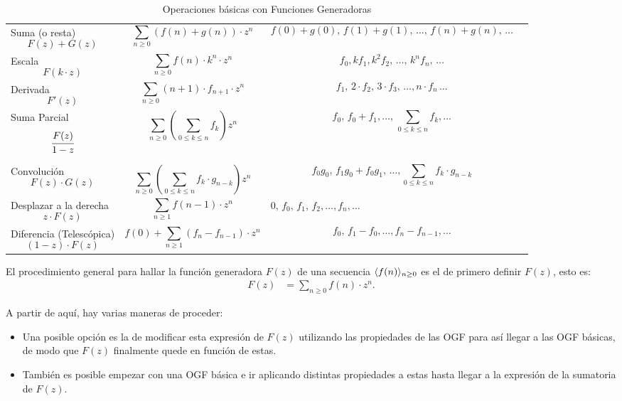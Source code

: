 \begin{table}[ht!]
\begin{tabularx}{\linewidth}{X X X X}
    {Suma  (o resta) \newline $$F(z)+G(z)$$}
    & $$\sum_{n\geq0}{(f(n) + g(n))\cdot z^n}$$ 
    & $$f(0) + g(0),\, f(1) + g(1),\,\dots,\,f(n)+g(n),\,\dots$$
    \\
    {Escala \newline $$F(k\cdot z)$$} 
    & $$\sum_{n\geq0}{f(n)\cdot k^n\cdot z^n}$$ 
    & $$f_0,kf_1,k^2f_2,\,\dots,\,k^nf_n,\,\dots$$
    \\
    {Derivada \newline $$F'(z)$$}
    & $$\sum_{n\geq0}{(n+1)\cdot f_{n+1}\cdot z^{n}}$$
    & $$f_1,\,2\cdot f_2,\,3\cdot f_3,\,\dots,n\cdot f_n\,\dots$$
    \\
    {Suma Parcial \newline $$\cfrac{F(z)}{1-z}$$}
    & $$\sum_{n\geq0}{\left(
        \sum_{0\leq k\leq n}{f_k}
    \right)z^n}$$
    &  $$f_0,\,f_0+f_1,\dots,\,\sum_{0\leq k \leq n}{f_k},\dots$$
    \\
    {Convolución  \newline $$F(z) \cdot G(z)$$}
    & $$\sum_{n\geq0}{\left(\sum_{0\leq k \leq n}{f_k\cdot g_{n-k}}\right)z^n}$$ 
    & $$f_0g_0,\,f_1g_0+f_0g_1,
    \,\dots,\sum_{0\leq k\leq n}{f_k\cdot g_{n-k}}$$ \\
    {Desplazar a la derecha \newline $$z\cdot F(z)$$}
    & $$\sum_{n\geq1}{f(n-1)\cdot z^n}$$
    & $0,\,f_0,\,f_1,\,f_2,\dots,f_n,\dots$
    \\
    {Diferencia (Telescópica) \newline $$(1-z)\cdot F(z)$$}
    & $$f(0) + \sum_{n\geq1}{(f_n - f_{n-1})\cdot  z^n}$$
    & $$f_0,\,f_1-f_0,\dots,f_n-f_{n-1},\dots$$
\end{tabularx}
\caption{Operaciones básicas con Funciones Generadoras}
\label{tab:ogf-basic-ops}
\end{table}

\clearpage

El procedimiento general para hallar la función generadora $F(z)$ de una secuencia $\langle f(n)\rangle_{n\geq 0}$ es el de primero definir $F(z)$, esto es:
\begin{align*}
    F(z)&=\sum_{n\geq0}{f(n)\cdot z^n}.
\end{align*}

A partir de aquí, hay varias maneras de proceder:

\begin{itemize}
    \item Una posible opción es la de modificar esta expresión de $F(z)$ utilizando las propiedades de las OGF para así llegar a las OGF básicas, de modo que $F(z)$ finalmente quede en función de estas. 
    \item También es posible empezar con una OGF básica e ir aplicando distintas propiedades a estas hasta llegar a la expresión de la sumatoria de $F(z)$.
\end{itemize}
